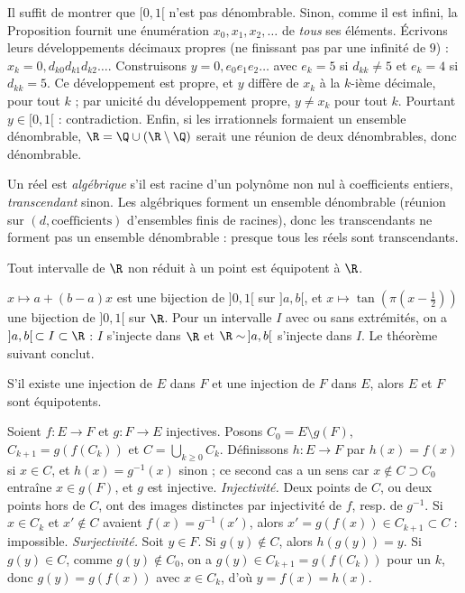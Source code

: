 \begin{preuve}
Il suffit de montrer que $[0,1[$ n'est pas dénombrable. Sinon, comme il est infini, la Proposition  fournit une énumération $x_0,x_1,x_2,\dots$ de \emph{tous} ses éléments. Écrivons leurs développements décimaux propres (ne finissant pas par une infinité de $9$) : $x_k=0{,}d_{k0}d_{k1}d_{k2}\dots$. Construisons $y=0{,}e_0e_1e_2\dots$ avec $e_k=5$ si $d_{kk}\neq5$ et $e_k=4$ si $d_{kk}=5$. Ce développement est propre, et $y$ diffère de $x_k$ à la $k$-ième décimale, pour tout $k$ ; par unicité du développement propre, $y\neq x_k$ pour tout $k$. Pourtant $y\in[0,1[$ : contradiction. Enfin, si les irrationnels formaient un ensemble dénombrable, $\R=\Q\cup(\R\setminus\Q)$ serait une réunion de deux dénombrables, donc dénombrable.
\end{preuve}
\begin{corollaire}
Un réel est \emph{algébrique} s'il est racine d'un polynôme non nul à coefficients entiers, \emph{transcendant} sinon. Les algébriques forment un ensemble dénombrable (réunion sur $(d,\text{coefficients})$ d'ensembles finis de racines), donc les transcendants ne forment pas un ensemble dénombrable : \og presque tous \fg{} les réels sont transcendants.
\end{corollaire}
\begin{proposition}[Intervalles]
Tout intervalle de $\R$ non réduit à un point est équipotent à $\R$.
\end{proposition}
\begin{preuve}
$x\mapsto a+(b-a)x$ est une bijection de $]0,1[$ sur $]a,b[$, et $x\mapsto \tan(\pi(x-\tfrac12))$ une bijection de $]0,1[$ sur $\R$. Pour un intervalle $I$ avec ou sans extrémités, on a $]a,b[\,\subset I\subset\R$ : $I$ s'injecte dans $\R$ et $\R\sim\,]a,b[$ s'injecte dans $I$. Le théorème suivant conclut.
\end{preuve}
\begin{theoreme}\label{thm-cb}
S'il existe une injection de $E$ dans $F$ et une injection de $F$ dans $E$, alors $E$ et $F$ sont équipotents.
\end{theoreme}
\begin{preuve}
Soient $f:E\to F$ et $g:F\to E$ injectives. Posons $C_0=E\setminus g(F)$, $C_{k+1}=g(f(C_k))$ et $C=\bigcup_{k\ge0}C_k$. Définissons $h:E\to F$ par $h(x)=f(x)$ si $x\in C$, et $h(x)=g^{-1}(x)$ sinon ; ce second cas a un sens car $x\notin C\supset C_0$ entraîne $x\in g(F)$, et $g$ est injective.
\emph{Injectivité.} Deux points de $C$, ou deux points hors de $C$, ont des images distinctes par injectivité de $f$, resp. de $g^{-1}$. Si $x\in C_k$ et $x'\notin C$ avaient $f(x)=g^{-1}(x')$, alors $x'=g(f(x))\in C_{k+1}\subset C$ : impossible.
\emph{Surjectivité.} Soit $y\in F$. Si $g(y)\notin C$, alors $h(g(y))=y$. Si $g(y)\in C$, comme $g(y)\notin C_0$, on a $g(y)\in C_{k+1}=g(f(C_k))$ pour un $k$, donc $g(y)=g(f(x))$ avec $x\in C_k$, d'où $y=f(x)=h(x)$.
\end{preuve}
